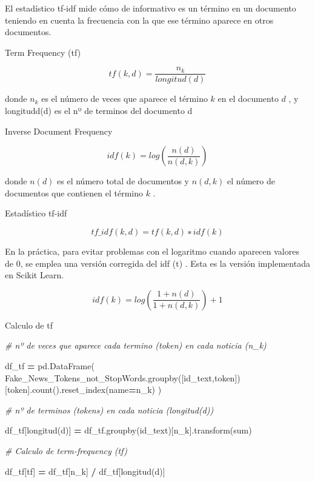 \documentclass[
  11pt,
  a4paper,
]{article}
\newenvironment{Shaded}{\begin{snugshade}}{\end{snugshade}}
\newcommand{\BuiltInTok}[1]{#1}
\newcommand{\CommentTok}[1]{\textcolor[rgb]{0.56,0.35,0.01}{\textit{#1}}}
\newcommand{\NormalTok}[1]{#1}
\newcommand{\OperatorTok}[1]{\textcolor[rgb]{0.81,0.36,0.00}{\textbf{#1}}}
\newcommand{\StringTok}[1]{\textcolor[rgb]{0.31,0.60,0.02}{#1}}
\begin{document}
El estadístico tf-idf mide cómo de informativo es un término en un
documento teniendo en cuenta la frecuencia con la que ese término
aparece en otros documentos.

Term Frequency (tf)

\[tf (k, d)= \dfrac{n_k}{longitud( d)}\]

donde \(n_k\) es el número de veces que aparece el término \(k\) en el
documento \(d\) , y longitudd(d) es el nº de terminos del documento d

Inverse Document Frequency

\[idf (k)=log(\dfrac{n(d)}{n(d,k)})\]

donde \(n(d)\) es el número total de documentos y \(n(d,k)\) el número
de documentos que contienen el término \(k\) .

Estadístico tf-idf

\[tf\_idf(k, d)=tf (k, d)∗idf (k)\]

En la práctica, para evitar problemas con el logaritmo cuando aparecen
valores de 0, se emplea una versión corregida del idf (t) . Esta es la
versión implementada en Scikit Learn.

\[idf (k)=log(\dfrac{1+n(d)}{1+n(d,k)})+1\]

Calculo de tf

\begin{Shaded}
\begin{Highlighting}[]
\CommentTok{\# nº de veces que aparece cada termino (token) en cada noticia (n\_k)}

\NormalTok{df\_tf }\OperatorTok{=}\NormalTok{ pd.DataFrame( Fake\_News\_Tokens\_not\_StopWords.groupby([}\StringTok{\textquotesingle{}id\_text\textquotesingle{}}\NormalTok{,}\StringTok{\textquotesingle{}token\textquotesingle{}}\NormalTok{])[}\StringTok{\textquotesingle{}token\textquotesingle{}}\NormalTok{].count().reset\_index(name}\OperatorTok{=}\StringTok{\textquotesingle{}n\_k\textquotesingle{}}\NormalTok{) )}

\CommentTok{\# nº de terminos (tokens) en cada noticia (longitud(d))}

\NormalTok{df\_tf[}\StringTok{\textquotesingle{}longitud(d)\textquotesingle{}}\NormalTok{] }\OperatorTok{=}\NormalTok{ df\_tf.groupby(}\StringTok{\textquotesingle{}id\_text\textquotesingle{}}\NormalTok{)[}\StringTok{\textquotesingle{}n\_k\textquotesingle{}}\NormalTok{].transform(}\BuiltInTok{sum}\NormalTok{)}

\CommentTok{\# Calculo de term{-}frequency (tf)}

\NormalTok{df\_tf[}\StringTok{\textquotesingle{}tf\textquotesingle{}}\NormalTok{] }\OperatorTok{=}\NormalTok{ df\_tf[}\StringTok{\textquotesingle{}n\_k\textquotesingle{}}\NormalTok{] }\OperatorTok{/}\NormalTok{ df\_tf[}\StringTok{\textquotesingle{}longitud(d)\textquotesingle{}}\NormalTok{]}
\end{Highlighting}
\end{Shaded}
\end{document}
